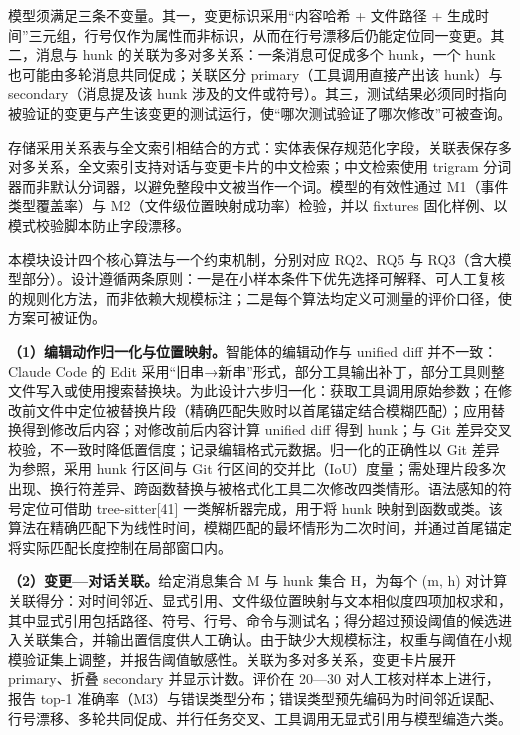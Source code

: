 模型须满足三条不变量。其一，变更标识采用“内容哈希 + 文件路径 + 生成时间”三元组，行号仅作为属性而非标识，从而在行号漂移后仍能定位同一变更。其二，消息与 hunk 的关联为多对多关系：一条消息可促成多个 hunk，一个 hunk 也可能由多轮消息共同促成；关联区分 primary（工具调用直接产出该 hunk）与 secondary（消息提及该 hunk 涉及的文件或符号）。其三，测试结果必须同时指向被验证的变更与产生该变更的测试运行，使“哪次测试验证了哪次修改”可被查询。

存储采用关系表与全文索引相结合的方式：实体表保存规范化字段，关联表保存多对多关系，全文索引支持对话与变更卡片的中文检索；中文检索使用 trigram 分词器而非默认分词器，以避免整段中文被当作一个词。模型的有效性通过 M1（事件类型覆盖率）与 M2（文件级位置映射成功率）检验，并以 fixtures 固化样例、以模式校验脚本防止字段漂移。

\clearpage
{}

本模块设计四个核心算法与一个约束机制，分别对应 RQ2、RQ5 与 RQ3（含大模型部分）。设计遵循两条原则：一是在小样本条件下优先选择可解释、可人工复核的规则化方法，而非依赖大规模标注；二是每个算法均定义可测量的评价口径，使方案可被证伪。

\textbf{（1）编辑动作归一化与位置映射。}智能体的编辑动作与 unified diff 并不一致：Claude Code 的 Edit 采用“旧串→新串”形式，部分工具输出补丁，部分工具则整文件写入或使用搜索替换块。为此设计六步归一化：获取工具调用原始参数；在修改前文件中定位被替换片段（精确匹配失败时以首尾锚定结合模糊匹配）；应用替换得到修改后内容；对修改前后内容计算 unified diff 得到 hunk；与 Git 差异交叉校验，不一致时降低置信度；记录编辑格式元数据。归一化的正确性以 Git 差异为参照，采用 hunk 行区间与 Git 行区间的交并比（IoU）度量；需处理片段多次出现、换行符差异、跨函数替换与被格式化工具二次修改四类情形。语法感知的符号定位可借助 tree-sitter[41] 一类解析器完成，用于将 hunk 映射到函数或类。该算法在精确匹配下为线性时间，模糊匹配的最坏情形为二次时间，并通过首尾锚定将实际匹配长度控制在局部窗口内。

\textbf{（2）变更—对话关联。}给定消息集合 M 与 hunk 集合 H，为每个 (m, h) 对计算关联得分：对时间邻近、显式引用、文件级位置映射与文本相似度四项加权求和，其中显式引用包括路径、符号、行号、命令与测试名；得分超过预设阈值的候选进入关联集合，并输出置信度供人工确认。由于缺少大规模标注，权重与阈值在小规模验证集上调整，并报告阈值敏感性。关联为多对多关系，变更卡片展开 primary、折叠 secondary 并显示计数。评价在 20—30 对人工核对样本上进行，报告 top-1 准确率（M3）与错误类型分布；错误类型预先编码为时间邻近误配、行号漂移、多轮共同促成、并行任务交叉、工具调用无显式引用与模型编造六类。


